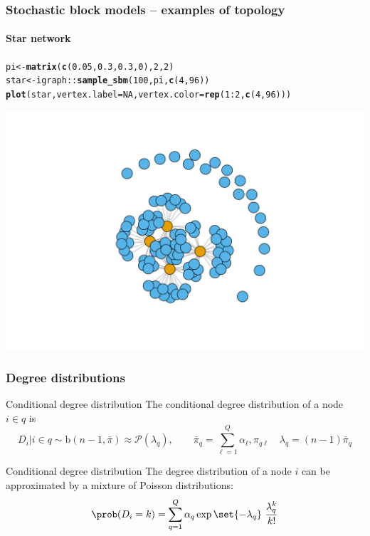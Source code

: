 \documentclass{beamer}\usepackage[]{graphicx}\usepackage[]{color}
\makeatletter
\newcommand{\hlnum}[1]{\textcolor[rgb]{0.686,0.059,0.569}{#1}}%
\newcommand{\hlopt}[1]{\textcolor[rgb]{0,0,0}{#1}}%
\newcommand{\hlstd}[1]{\textcolor[rgb]{0.345,0.345,0.345}{#1}}%
\newcommand{\hlkwb}[1]{\textcolor[rgb]{0.69,0.353,0.396}{#1}}%
\newcommand{\hlkwc}[1]{\textcolor[rgb]{0.333,0.667,0.333}{#1}}%
\newcommand{\hlkwd}[1]{\textcolor[rgb]{0.737,0.353,0.396}{\textbf{#1}}}%
\newenvironment{kframe}{%
 \def\at@end@of@kframe{}%
 \ifinner\ifhmode%
  \def\at@end@of@kframe{\end{minipage}}%
  \begin{minipage}{\columnwidth}%
 \fi\fi%
 \def\FrameCommand##1{\hskip\@totalleftmargin \hskip-\fboxsep
 \colorbox{shadecolor}{##1}\hskip-\fboxsep
     \hskip-\linewidth \hskip-\@totalleftmargin \hskip\columnwidth}%
 \MakeFramed {\advance\hsize-\width
   \@totalleftmargin\z@ \linewidth\hsize
   \@setminipage}}%
 {\par\unskip\endMakeFramed%
 \at@end@of@kframe}
\newenvironment{knitrout}{}{} %
\makeatother
\begin{document}
\begin{frame}[fragile]
  \frametitle{Stochastic block models -- examples of topology}
  \framesubtitle{Star network}

\begin{knitrout}\scriptsize
{}\color{fgcolor}\begin{kframe}
\begin{alltt}
\hlstd{pi} \hlkwb{<-} \hlkwd{matrix}\hlstd{(}\hlkwd{c}\hlstd{(}\hlnum{0.05}\hlstd{,}\hlnum{0.3}\hlstd{,}\hlnum{0.3}\hlstd{,}\hlnum{0}\hlstd{),}\hlnum{2}\hlstd{,}\hlnum{2}\hlstd{)}
\hlstd{star} \hlkwb{<-} \hlstd{igraph}\hlopt{::}\hlkwd{sample_sbm}\hlstd{(}\hlnum{100}\hlstd{, pi,} \hlkwd{c}\hlstd{(}\hlnum{4}\hlstd{,} \hlnum{96}\hlstd{))}
\hlkwd{plot}\hlstd{(star,} \hlkwc{vertex.label}\hlstd{=}\hlnum{NA}\hlstd{,} \hlkwc{vertex.color} \hlstd{=} \hlkwd{rep}\hlstd{(}\hlnum{1}\hlopt{:}\hlnum{2}\hlstd{,}\hlkwd{c}\hlstd{(}\hlnum{4}\hlstd{,}\hlnum{96}\hlstd{)))}
\end{alltt}
\end{kframe}
\includegraphics[width=.8\textwidth]{figures/unnamed-chunk-2-1} 

\end{knitrout}

\end{frame}

\begin{frame}
  \frametitle{Degree distributions}

  \begin{block}{Conditional degree distribution}
    The conditional degree distribution of a node $i\in q$ is
    \begin{equation*}
      D_i | i \in q \sim \mathrm{b}(n-1,\bar\pi) \approx \mathcal{P}(\lambda_q), \qquad \bar\pi_q = \sum_{\ell=1}^Q \alpha_\ell, \pi_{q\ell} \quad \lambda_q = (n-1)\bar\pi_q
    \end{equation*}
  \end{block}

  \vfill

  \begin{block}{Conditional degree distribution}
    The degree distribution of a node $i$ can be approximated by a mixture of Poisson distributions:
    \begin{equation*}
      \prob(D_i = k) = \sum_{q=1}^Q\alpha_q \exp{\set{-\lambda_q}} \ \frac{\lambda_q^k}{k !}
    \end{equation*}
  \end{block}

\end{frame}
\end{document}
